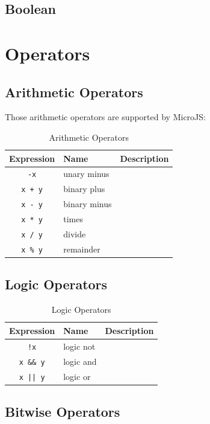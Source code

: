 \documentclass[11pt]{article} %
\begin{document}
\subsection {Boolean}

\section {Operators}

\subsection {Arithmetic Operators}

Those arithmetic operators are supported by MicroJS:

\begin{table}[H]
\begin{tabular}{ c l l }
	\toprule
	{\bf Expression} & {\bf Name}  & {\bf Description} \\
	\midrule 
	{\tt -x} & unary minus & \\
	{\tt x + y} & binary plus &  \\
	{\tt x - y} & binary minus &  \\
	{\tt x * y} & times &  \\
	{\tt x / y} & divide &  \\
	{\tt x \% y} & remainder &  \\
	\bottomrule
\end{tabular}
\centering
\caption{Arithmetic Operators}
\label{tab:operators}
\end{table} 

\subsection {Logic Operators}

\begin{table}[H]
\begin{tabular}{ c l l }
	\toprule
	{\bf Expression} & {\bf Name}  & {\bf Description} \\
	\midrule 
	{\tt !x} & logic not & \\
	{\tt x \&\& y} & logic and &  \\
	{\tt x || y} & logic or &  \\
	\bottomrule
\end{tabular}
\centering
\caption{Logic Operators}
\label{tab:operators}
\end{table} 

\subsection{Bitwise Operators}
\end{document}
